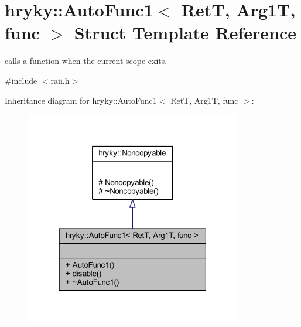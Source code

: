 \hypertarget{structhryky_1_1_auto_func1}{\section{hryky\-:\-:Auto\-Func1$<$ Ret\-T, Arg1\-T, func $>$ Struct Template Reference}
\label{structhryky_1_1_auto_func1}
}


calls a function when the current scope exits.  




{\ttfamily \#include $<$raii.\-h$>$}



Inheritance diagram for hryky\-:\-:Auto\-Func1$<$ Ret\-T, Arg1\-T, func $>$\-:\nopagebreak
\begin{figure}[H]
\begin{center}
\leavevmode
\includegraphics[width=268pt]{structhryky_1_1_auto_func1__inherit__graph}
\end{center}
\end{figure}
